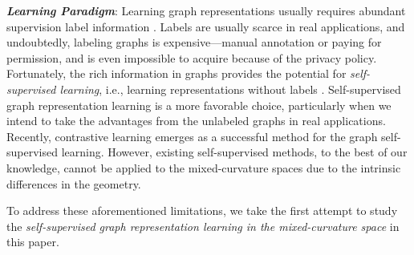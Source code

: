 \noindent \textbf{\emph{Learning Paradigm}}:
Learning graph representations usually requires abundant supervision label information \cite{velickovic2018graph,HGCN}.
Labels are usually scarce in real applications, 
and undoubtedly, labeling graphs is expensive—manual annotation or paying for permission, and is even impossible to acquire because of the privacy policy.
Fortunately, the rich information in graphs provides the potential for \emph{self-supervised learning}, i.e., learning representations without labels \cite{DBLP:journals/corr/abs-2006-08218}. 
Self-supervised graph representation learning is a more favorable choice, 
particularly when we intend to take the advantages from the unlabeled graphs in real applications.
Recently, contrastive learning \cite{VelickovicFHLBH19,QiuCDZYDWT20}
emerges as a successful method for the graph self-supervised learning.
However, existing self-supervised methods, 
to the best of our knowledge, 
cannot be applied to the mixed-curvature spaces due to the intrinsic differences in the geometry.


To address these aforementioned limitations, 
we take the first attempt to study the \emph{self-supervised graph representation learning in the mixed-curvature space} in this paper. 


